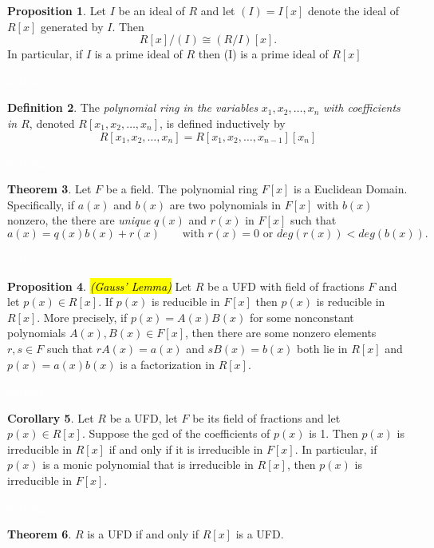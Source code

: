 \documentclass{article}
\theoremstyle{definition}
\newtheorem{thm}{Theorem}[section]
\newtheorem{prop}[thm]{Proposition}
\newtheorem{cor}[thm]{Corollary}
\newtheorem{defn}[thm]{Definition}
\newcommand{\nl}{\textcolor{white}{nothing}}
\begin{document}
\begin{prop}
Let $I$ be an ideal of $R$ and let $(I) = I[x]$ denote the ideal of $R[x]$ generated by $I$. Then 
\[R[x]/(I) \cong (R/I)[x].\]
In particular, if $I$ is a prime ideal of $R$ then (I) is a prime ideal of $R[x]$
\end{prop}

\nl

\begin{defn}
The \textit{polynomial ring in the variables} $x_1,x_2,\ldots,x_n$ \textit{with coefficients in $R$}, denoted $R[x_1,x_2,\ldots,x_n]$, is defined inductively by
\[R[x_1,x_2,\ldots,x_n] = R[x_1,x_2,\ldots,x_{n-1}][x_n]\]
\end{defn}

\nl

\begin{thm}
Let $F$ be a field. The polynomial ring $F[x]$ is a Euclidean Domain. Specifically, if $a(x)$ and $b(x)$ are two polynomials in $F[x]$ with $b(x)$ nonzero, the there are \textit{unique} $q(x)$ and $r(x)$ in $F[x]$ such that
\[a(x) = q(x)b(x) + r(x)\qquad\text{with } r(x) = 0\text{ or } deg(r(x))<deg(b(x)).\]
\end{thm}

\nl

\begin{prop}\hl{\textit{(Gauss' Lemma)}} Let $R$ be a UFD with field of fractions $F$ and let $p(x)\in R[x]$. If $p(x)$ is reducible in $F[x]$ then $p(x)$ is reducible in $R[x]$. More precisely, if $p(x) = A(x)B(x)$ for some nonconstant polynomials $A(x),B(x)\in F[x]$, then there are some nonzero elements $r,s\in F$ such that $rA(x) = a(x)$ and $sB(x) = b(x)$ both lie in $R[x]$ and $p(x) = a(x)b(x)$ is a factorization in $R[x]$.
\end{prop}

\nl

\begin{cor}
Let $R$ be a UFD, let $F$ be its field of fractions and let $p(x)\in R[x]$. Suppose the gcd of the coefficients of $p(x)$ is 1. Then $p(x)$ is irreducible in $R[x]$ if and only if it is irreducible in $F[x]$. In particular, if $p(x)$ is a monic polynomial that is irreducible in $R[x]$, then $p(x)$ is irreducible in $F[x]$.
\end{cor}

\nl

\begin{thm}
$R$ is a UFD if and only if $R[x]$ is a UFD.
\end{thm}
\end{document}

